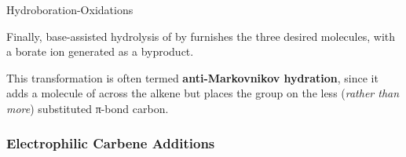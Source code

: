 \documentclass[10pt]{article}
\begin{document}
\begin{core}[label=core:alkene_hydro_oxi]{Hydroboration-Oxidations}
\begin{enumerate}[label=(\arabic*)]
          Finally, base-assisted hydrolysis of  by  furnishes the three desired  molecules, with a borate ion generated as a byproduct.


        \end{enumerate}

        This transformation is often termed \textbf{anti-Markovnikov hydration}, since it adds a molecule of  across the alkene but places the  group on the less (\textit{rather than more}) substituted π-bond carbon.

      \end{core}

    \subsubsection{Electrophilic Carbene Additions}
\end{document}
